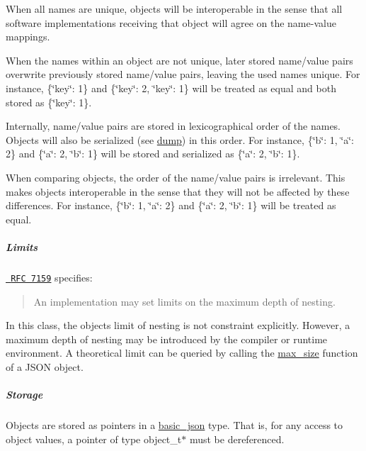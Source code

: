 \begin{DoxyItemize}
\item When all names are unique, objects will be interoperable in the sense that all software implementations receiving that object will agree on the name-\/value mappings.
\item When the names within an object are not unique, later stored name/value pairs overwrite previously stored name/value pairs, leaving the used names unique. For instance, {\ttfamily \{\char`\"{}key\char`\"{}\+: 1\}} and {\ttfamily \{\char`\"{}key\char`\"{}\+: 2, \char`\"{}key\char`\"{}\+: 1\}} will be treated as equal and both stored as {\ttfamily \{\char`\"{}key\char`\"{}\+: 1\}}.
\item Internally, name/value pairs are stored in lexicographical order of the names. Objects will also be serialized (see \mbox{\hyperlink{classnlohmann_1_1basic__json_a5319dc1bb9dfe19ce7ff559aaded3422}{dump}}) in this order. For instance, {\ttfamily \{\char`\"{}b\char`\"{}\+: 1, \char`\"{}a\char`\"{}\+: 2\}} and {\ttfamily \{\char`\"{}a\char`\"{}\+: 2, \char`\"{}b\char`\"{}\+: 1\}} will be stored and serialized as {\ttfamily \{\char`\"{}a\char`\"{}\+: 2, \char`\"{}b\char`\"{}\+: 1\}}.
\item When comparing objects, the order of the name/value pairs is irrelevant. This makes objects interoperable in the sense that they will not be affected by these differences. For instance, {\ttfamily \{\char`\"{}b\char`\"{}\+: 1, \char`\"{}a\char`\"{}\+: 2\}} and {\ttfamily \{\char`\"{}a\char`\"{}\+: 2, \char`\"{}b\char`\"{}\+: 1\}} will be treated as equal.
\end{DoxyItemize}

\subparagraph*{Limits}

\href{http://rfc7159.net/rfc7159}{\texttt{ R\+FC 7159}} specifies\+: \begin{quote}
An implementation may set limits on the maximum depth of nesting. \end{quote}


In this class, the object\textquotesingle{}s limit of nesting is not constraint explicitly. However, a maximum depth of nesting may be introduced by the compiler or runtime environment. A theoretical limit can be queried by calling the \mbox{\hyperlink{classnlohmann_1_1basic__json_a2f47d3c6a441c57dd2be00449fbb88e1}{max\+\_\+size}} function of a J\+S\+ON object.

\subparagraph*{Storage}

Objects are stored as pointers in a \mbox{\hyperlink{classnlohmann_1_1basic__json}{basic\+\_\+json}} type. That is, for any access to object values, a pointer of type {\ttfamily object\+\_\+t$\ast$} must be dereferenced.

